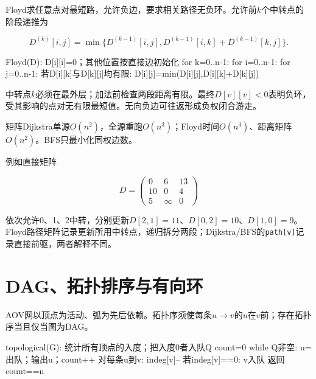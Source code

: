 Floyd求任意点对最短路，允许负边，要求相关路径无负环。允许前\(k\)个中转点的阶段递推为

\[D^{(k)}[i,j]=\min\{D^{(k-1)}[i,j],D^{(k-1)}[i,k]+D^{(k-1)}[k,j]\}.\]

\par\smallskip\noindent\begin{minipage}{\linewidth}
\begin{codeblock}[language={}]
Floyd(D):
    D[i][i]=0；其他位置按直接边初始化
    for k=0..n-1:
        for i=0..n-1:
            for j=0..n-1:
                若D[i][k]与D[k][j]均有限:
                    D[i][j]=min(D[i][j],D[i][k]+D[k][j])
\end{codeblock}
\end{minipage}\par\smallskip

中转点\(k\)必须在最外层；加法前检查两段距离有限。最终\(D[v][v]<0\)表明负环，受其影响的点对无有限最短值。无向负边可往返形成负权闭合游走。

矩阵Dijkstra单源\(O(n^2)\)，全源重跑\(O(n^3)\)；Floyd时间\(O(n^3)\)、距离矩阵\(O(n^2)\)。BFS只最小化同权边数。

例如直接矩阵

\[D=\begin{pmatrix}0&6&13\\10&0&4\\5&\infty&0\end{pmatrix}\]

依次允许0、1、2中转，分别更新\(D[2,1]=11\)、\(D[0,2]=10\)、\(D[1,0]=9\)。Floyd路径矩阵记录更新所用中转点，递归拆分两段；Dijkstra/BFS的\texttt{path[\allowbreak{}v]\allowbreak{}}记录直接前驱，两者解释不同。

\section{DAG、拓扑排序与有向环}\label{DS06-topological}

AOV网以顶点为活动、弧为先后依赖。拓扑序须使每条\(u\to v\)的\(u\)在\(v\)前；存在拓扑序当且仅当图为DAG。

\par\smallskip\noindent\begin{minipage}{\linewidth}
\begin{codeblock}[language={}]
topological(G):
    统计所有顶点的入度；把入度0者入队Q
    count=0
    while Q非空:
        u=出队；输出u；count++
        对每条u到v: indeg[v]--
            若indeg[v]==0: v入队
    返回count==n
\end{codeblock}
\end{minipage}\par\smallskip

